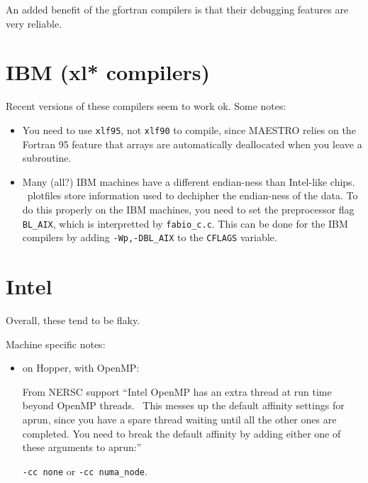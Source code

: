 An added benefit of the gfortran compilers is that their debugging
features are very reliable.


\section{IBM (xl* compilers)}

Recent versions of these compilers seem to work ok.  Some notes:
\begin{itemize}
\item You need to use {\tt xlf95}, not {\tt xlf90} to compile, since
  MAESTRO relies on the Fortran 95 feature that arrays are
  automatically deallocated when you leave a subroutine.

\item Many (all?) IBM machines have a different endian-ness than
  Intel-like chips.  \boxlib\ plotfiles store information used to
  dechipher the endian-ness of the data.  To do this properly on
  the IBM machines, you need to set the preprocessor flag {\tt BL\_AIX},
  which is interpretted by {\tt fabio\_c.c}.  This can be done for the
  IBM compilers by adding {\tt -Wp,-DBL\_AIX} to the {\tt CFLAGS} variable.

\end{itemize}

\section{Intel}

Overall, these tend to be flaky. 

Machine specific notes:

\begin{itemize}
\item on Hopper, with OpenMP:

From NERSC support ``Intel OpenMP has an extra thread at run time
beyond OpenMP threads.  This messes up the default affinity settings
for aprun, since you have a spare thread waiting until all the other
ones are completed.  You need to break the default affinity by adding
either one of these arguments to aprun:''

{\tt -cc none} or {\tt -cc numa\_node}.
\end{itemize}

